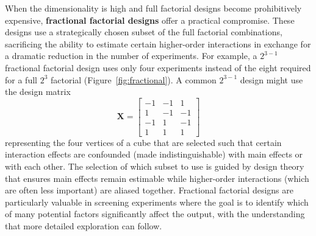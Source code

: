 When the dimensionality is high and full factorial designs become prohibitively expensive, \textbf{fractional factorial designs} offer a practical compromise. These designs use a strategically chosen subset of the full factorial combinations, sacrificing the ability to estimate certain higher-order interactions in exchange for a dramatic reduction in the number of experiments. For example, a $2^{3-1}$ fractional factorial design uses only four experiments instead of the eight required for a full $2^3$ factorial (Figure~\ref{fig:fractional}). A common $2^{3-1}$ design might use the design matrix
\begin{equation}
    \mathbf{X} = \begin{bmatrix} -1 & -1 & 1 \\ 1 & -1 & -1 \\ -1 & 1 & -1 \\ 1 & 1 & 1 \end{bmatrix}
\end{equation}
representing the four vertices of a cube that are selected such that certain interaction effects are confounded (made indistinguishable) with main effects or with each other. The selection of which subset to use is guided by design theory that ensures main effects remain estimable while higher-order interactions (which are often less important) are aliased together. Fractional factorial designs are particularly valuable in screening experiments where the goal is to identify which of many potential factors significantly affect the output, with the understanding that more detailed exploration can follow.

